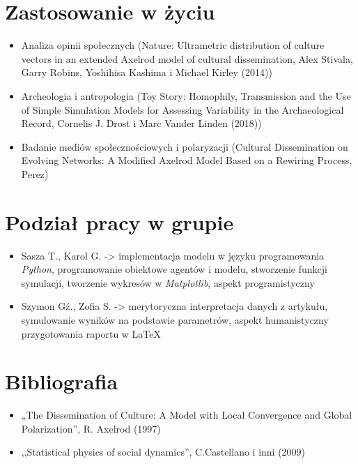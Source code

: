 \documentclass[polish,11pt,a4paper]{article}
\begin{document}
   


	\section{Zastosowanie w życiu}
	\begin{itemize}
	\item Analiza opinii społecznych (Nature: Ultrametric distribution of culture vectors in 
	an extended Axelrod model of cultural dissemination, Alex Stivala, Garry Robins, Yoshihisa
	 Kashima i Michael Kirley (2014))
	\item Archeologia i antropologia (Toy Story: Homophily, Transmission 
	and the Use of Simple Simulation Models for Assessing Variability in the Archaeological 
	Record, Cornelis J. Drost i Marc Vander Linden (2018))
	\item Badanie mediów społecznościowych i polaryzacji (Cultural Dissemination on Evolving Networks: A Modified Axelrod Model Based on a Rewiring Process, Perez)
	\end{itemize}

	\section{Podział pracy w grupie}
		\begin{itemize}
			\item Sasza T., Karol G. -> implementacja modelu w języku programowania \emph{Python}, programowanie obiektowe agentów i modelu, stworzenie funkcji symulacji, tworzenie wykresów w \emph{Matplotlib}, aspekt programistyczny  
			
			\item Szymon Gź., Zofia S. -> merytoryczna interpretacja danych z artykułu, symulowanie wyników na podstawie parametrów,
			aspekt humanistyczny przygotowania raportu w \LaTeX
		\end{itemize}

	\section{Bibliografia}
	\begin{itemize}
		\item[--] „The Dissemination of Culture: 
		A Model with Local Convergence and Global Polarization”, R. Axelrod (1997)
		\item[--] ,,Statistical physics of social dynamics'', C.Castellano i inni (2009)
	\end{itemize}
	
\end{document}
